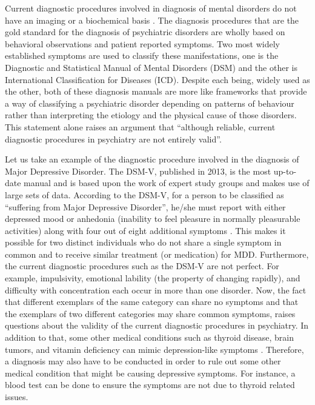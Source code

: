 ﻿\documentclass[12pt]{article}
\begin{document}
Current diagnostic procedures involved in diagnosis of mental
disorders do not have an imaging or a biochemical basis
\cite{nobiochemicalbasis} \cite{noimagingbasis}. The diagnosis
procedures that are the gold standard for the diagnosis of psychiatric
disorders are wholly based on behavioral observations and patient
reported symptoms. Two most widely established symptoms are used to
classify these manifestations, one is the Diagnostic and Statistical
Manual of Mental Disorders (DSM) and the other is International
Classification for Diseases (ICD). Despite each being, widely used as
the other, both of these diagnosis manuals are more like frameworks
that provide a way of classifying a psychiatric disorder depending on
patterns of behaviour rather than interpreting the etiology and the
physical cause of those disorders. This statement alone raises an
argument that ``although reliable, current diagnostic procedures in
psychiatry are not entirely valid''.

Let us take an example of the diagnostic procedure involved in the
diagnosis of Major Depressive Disorder. The DSM-V, published in 2013,
is the most up-to-date manual and is based upon the work of expert
study groups and makes use of large sets of data. According to the
DSM-V, for a person to be classified as ``suffering from Major
Depressive Disorder'', he/she must report with either depressed mood
or anhedonia (inability to feel pleasure in normally pleasurable
activities) along with four out of eight additional symptoms
\cite{diagnosticbrainimaging}. This makes it possible for two distinct
individuals who do not share a single symptom in common and to receive
similar treatment (or medication) for MDD. Furthermore, the current
diagnostic procedures such as the DSM-V are not perfect. For example,
impulsivity, emotional lability (the property of changing rapidly),
and difficulty with concentration each occur in more than one
disorder. Now, the fact that different exemplars of the same category
can share no symptoms and that the exemplars of two different
categories may share common symptoms, raises questions about the
validity of the current diagnostic procedures in psychiatry. In
addition to that, some other medical conditions such as thyroid
disease, brain tumors, and vitamin deficiency can mimic
depression-like symptoms \cite{externalfactorsinMDD}. Therefore,
a diagnosis may also have to be conducted in order to rule out some
other medical condition that might be causing depressive symptoms. For
instance, a blood test can be done to ensure the symptoms are not due
to thyroid related issues.
\end{document}
